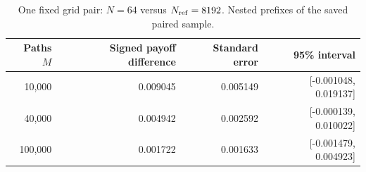 \begin{table}[H]\centering\small
\caption{One fixed grid pair: $N=64$ versus $N_{\rm ref}=8192$. Nested prefixes of the saved paired sample.}\label{tab:sample-size}
\begin{tabular}{rrrr}\toprule
Paths $M$ & Signed payoff difference & Standard error & 95\% interval\\\midrule
10,000 & 0.009045 & 0.005149 & [-0.001048, 0.019137]\\
40,000 & 0.004942 & 0.002592 & [-0.000139, 0.010022]\\
100,000 & 0.001722 & 0.001633 & [-0.001479, 0.004923]\\
\bottomrule\end{tabular}
\end{table}
